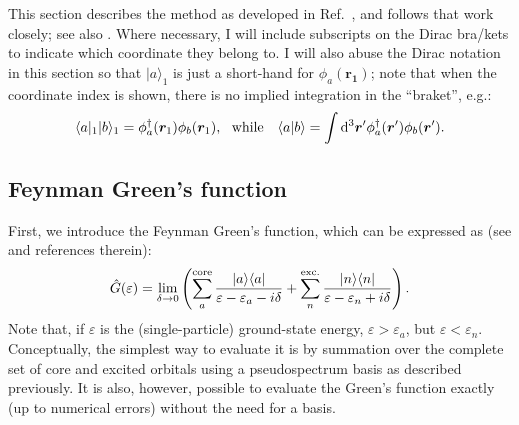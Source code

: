 \documentclass[10pt,twocolumn,a4paper]{article}%
\newcommand{\bra}[1]{\ensuremath{\langle #1|}}	%
\newcommand{\ket}[1]{\ensuremath{|#1\rangle}}	%
\newcommand{\braket}[1]{\ensuremath{\langle #1\rangle}}	%
\renewcommand{\v}[1]{\ensuremath{\boldsymbol{#1}}}		%
\newcommand{\be}{\begin{equation}}
\newcommand{\ee}{\end{equation}}
\def\d{\ensuremath{{\rm d}}}
\def\en{\ensuremath{\varepsilon}}
\begin{document}

This section describes the method as developed in Ref.~\cite{DzubaCPM1988pla}, and follows that work closely; see also \cite{Abrikosov1965,DzubaCPM1989plaEn,GingesCs2002}.
Where necessary, I will include subscripts on the Dirac bra/kets to indicate which coordinate they belong to.
I will also abuse the Dirac notation in this section so that $\ket{a}_1$ is just a short-hand for $\phi_a(\v{r_1})$; note that when the coordinate index is shown, there is no implied integration in the ``braket'', e.g.:
\[
\bra{a}_1\ket{b}_1 = \phi^\dag_a(\v{r}_1)\phi_b(\v{r}_1),
~~ \text{while}\quad
\braket{a|b} = \int\d^3\v{r}'\phi^\dag_a(\v{r}')\phi_b(\v{r}').
\]


\subsection{Feynman Green's function}

First, we introduce the Feynman Green's function, which can be expressed as (see \cite{DzubaCPM1988pla,Abrikosov1965} and references therein):
\be\label{eq:FeynmanGreen}
\hat G(\en) = \lim_{\delta\to0}\left(
\sum_a^{\rm core}\frac{\ket{a}\bra{a}}{\en-\en_a-i\delta}
+ \sum_n^{\rm exc.}\frac{\ket{n}\bra{n}}{\en-\en_n+i\delta}\right).
\ee
Note that, if $\en$ is the (single-particle) ground-state energy, $\en>\en_a$, but $\en<\en_n$.
Conceptually, the simplest way to evaluate it is by summation over the complete set of core and excited orbitals using a pseudospectrum basis as described previously.
It is also, however, possible to evaluate the Green's function exactly (up to numerical errors) without the need for a basis.
\end{document}
